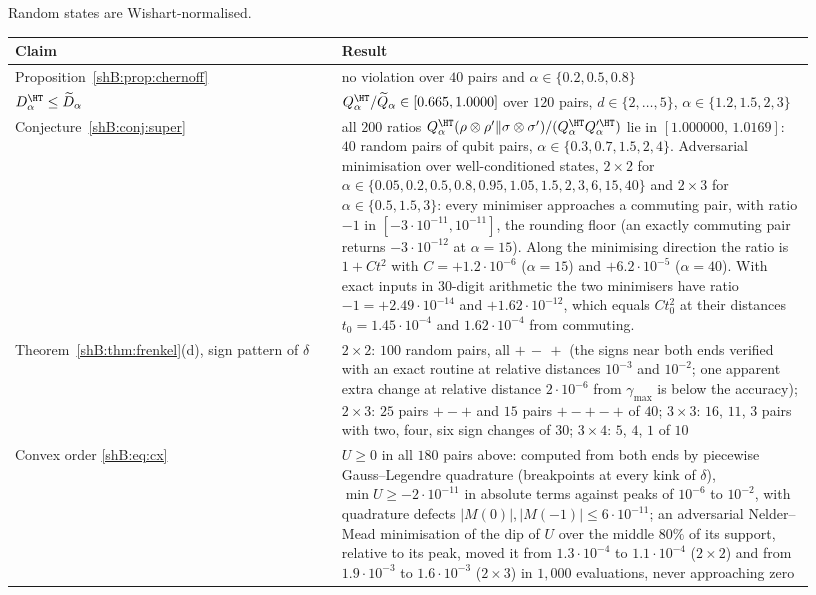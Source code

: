 Random states are Wishart-normalised.
{\small
\begin{longtable}{>{\raggedright\arraybackslash}p{0.38\linewidth}>{\raggedright\arraybackslash}p{0.55\linewidth}}
\toprule
Claim & Result\\
\midrule
\endhead
Proposition~\ref{shB:prop:chernoff} & no violation over $40$ pairs and $\alpha\in\{0.2,0.5,0.8\}$\\
$D^\HT_\alpha\le\widetilde D_\alpha$ \cite{LiuHircheCheng2025} & $Q^\HT_\alpha/\widetilde Q_\alpha\in[0.665,1.0000]$ over $120$ pairs, $d\in\{2,\dots,5\}$, $\alpha\in\{1.2,1.5,2,3\}$\\
Conjecture~\ref{shB:conj:super} & all $200$ ratios $Q^\HT_\alpha(\rho\otimes\rho'\|\sigma\otimes\sigma')/(Q^\HT_\alpha Q'^\HT_\alpha)$ lie in $[1.000000,\,1.0169]$: $40$ random pairs of qubit pairs, $\alpha\in\{0.3,0.7,1.5,2,4\}$. Adversarial minimisation over well-conditioned states, $2\times2$ for $\alpha\in\{0.05,0.2,0.5,0.8,0.95,1.05,1.5,2,3,6,15,40\}$ and $2\times3$ for $\alpha\in\{0.5,1.5,3\}$: every minimiser approaches a commuting pair, with ratio $-1$ in $[-3\cdot10^{-11},10^{-11}]$, the rounding floor (an exactly commuting pair returns $-3\cdot10^{-12}$ at $\alpha=15$). Along the minimising direction the ratio is $1+Ct^2$ with $C=+1.2\cdot10^{-6}$ ($\alpha=15$) and $+6.2\cdot10^{-5}$ ($\alpha=40$). With exact inputs in $30$-digit arithmetic the two minimisers have ratio $-1=+2.49\cdot10^{-14}$ and $+1.62\cdot10^{-12}$, which equals $Ct_0^2$ at their distances $t_0=1.45\cdot10^{-4}$ and $1.62\cdot10^{-4}$ from commuting.\\
Theorem~\ref{shB:thm:frenkel}(d), sign pattern of $\delta$ & $2\times2$: $100$ random pairs, all $+\,-\,+$ (the signs near both ends verified with an exact routine at relative distances $10^{-3}$ and $10^{-2}$; one apparent extra change at relative distance $2\cdot10^{-6}$ from $\gamma_{\max}$ is below the accuracy); $2\times3$: $25$ pairs $+-+$ and $15$ pairs $+-+-+$ of $40$; $3\times3$: $16$, $11$, $3$ pairs with two, four, six sign changes of $30$; $3\times4$: $5$, $4$, $1$ of $10$\\
Convex order \eqref{shB:eq:cx} & $U\ge0$ in all $180$ pairs above: computed from both ends by piecewise Gauss--Legendre quadrature (breakpoints at every kink of $\delta$), $\min U\ge-2\cdot10^{-11}$ in absolute terms against peaks of $10^{-6}$ to $10^{-2}$, with quadrature defects $|M(0)|,|M(-1)|\le6\cdot10^{-11}$; an adversarial Nelder--Mead minimisation of the dip of $U$ over the middle $80\%$ of its support, relative to its peak, moved it from $1.3\cdot10^{-4}$ to $1.1\cdot10^{-4}$ ($2\times2$) and from $1.9\cdot10^{-3}$ to $1.6\cdot10^{-3}$ ($2\times3$) in $1{,}000$ evaluations, never approaching zero\\

\end{longtable}}
